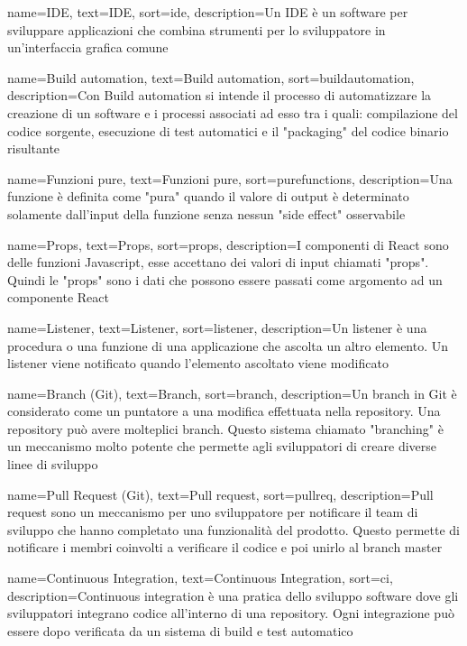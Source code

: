 {
	name=IDE,
	text=IDE,
	sort=ide,
	description={Un IDE è un software per sviluppare applicazioni che combina strumenti per lo sviluppatore in un'interfaccia grafica comune}
}

{
	name=Build automation,
	text=Build automation,
	sort=buildautomation,
	description={Con Build automation si intende il processo di automatizzare la creazione di un software e i processi associati ad esso tra i quali: compilazione del codice sorgente, esecuzione di test automatici e il "packaging" del codice binario risultante}
}

{
	name=Funzioni pure,
	text=Funzioni pure,
	sort=purefunctions,
	description={Una funzione è definita come "pura" quando il valore di output è determinato solamente dall'input della funzione senza nessun "side effect" osservabile}
}

{
	name=Props,
	text=Props,
	sort=props,
	description={I componenti di React sono delle funzioni Javascript, esse accettano dei valori di input chiamati "props". Quindi le "props" sono i dati che possono essere passati come argomento ad un componente React}
}

{
	name=Listener,
	text=Listener,
	sort=listener,
	description={Un listener è una procedura o una funzione di una applicazione che ascolta un altro elemento. Un listener viene notificato quando l'elemento ascoltato viene modificato}
}

{
	name=Branch (Git),
	text=Branch,
	sort=branch,
	description={Un branch in Git è considerato come un puntatore a una modifica effettuata nella repository. Una repository può avere molteplici branch. Questo sistema chiamato "branching" è un meccanismo molto potente che permette agli sviluppatori di creare diverse linee di sviluppo}
}

{
	name=Pull Request (Git),
	text=Pull request,
	sort=pullreq,
	description={Pull request sono un meccanismo per uno sviluppatore per notificare il team di sviluppo che hanno completato una funzionalità del prodotto. Questo permette di notificare i membri coinvolti a verificare il codice e poi unirlo al branch master}
}

{
	name=Continuous Integration,
	text=Continuous Integration,
	sort=ci,
	description={Continuous integration è una pratica dello sviluppo software dove gli sviluppatori integrano codice all'interno di una repository. Ogni integrazione può essere dopo verificata da un sistema di build e test automatico}
}

